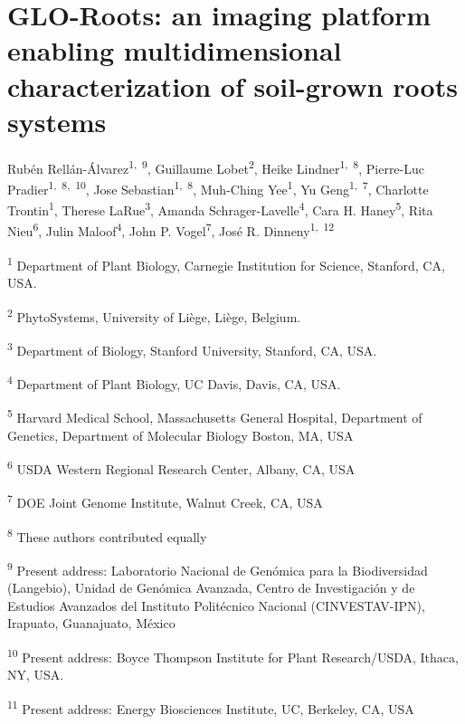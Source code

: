\documentclass[]{article}
\date{}
\begin{document}
\section{GLO-Roots: an imaging platform enabling multidimensional
characterization of soil-grown roots
systems}\label{glo-roots-an-imaging-platform-enabling-multidimensional-characterization-of-soil-grown-roots-systems}

Rubén Rellán-Álvarez\textsuperscript{1,~9}, Guillaume
Lobet\textsuperscript{2}, Heike Lindner\textsuperscript{1,~8},
Pierre-Luc Pradier\textsuperscript{1,~8,~10}, Jose
Sebastian\textsuperscript{1,~8}, Muh-Ching Yee\textsuperscript{1}, Yu
Geng\textsuperscript{1,~7}, Charlotte Trontin\textsuperscript{1},
Therese LaRue\textsuperscript{3}, Amanda
Schrager-Lavelle\textsuperscript{4}, Cara H. Haney\textsuperscript{5},
Rita Nieu\textsuperscript{6}, Julin Maloof\textsuperscript{4}, John P.
Vogel\textsuperscript{7}, José R. Dinneny\textsuperscript{1,~12}

\textsuperscript{1} Department of Plant Biology, Carnegie Institution
for Science, Stanford, CA, USA.

\textsuperscript{2} PhytoSystems, University of Liège, Liège, Belgium.

\textsuperscript{3} Department of Biology, Stanford University,
Stanford, CA, USA.

\textsuperscript{4} Department of Plant Biology, UC Davis, Davis, CA,
USA.

\textsuperscript{5} Harvard Medical School, Massachusetts General
Hospital, Department of Genetics, Department of Molecular Biology
Boston, MA, USA

\textsuperscript{6} USDA Western Regional Research Center, Albany, CA,
USA

\textsuperscript{7} DOE Joint Genome Institute, Walnut Creek, CA, USA

\textsuperscript{8} These authors contributed equally

\textsuperscript{9} Present address: Laboratorio Nacional de Genómica
para la Biodiversidad (Langebio), Unidad de Genómica Avanzada, Centro de
Investigación y de Estudios Avanzados del Instituto Politécnico Nacional
(CINVESTAV-IPN), Irapuato, Guanajuato, México

\textsuperscript{10} Present address: Boyce Thompson Institute for Plant
Research/USDA, Ithaca, NY, USA.

\textsuperscript{11} Present address: Energy Biosciences Institute, UC,
Berkeley, CA, USA
\end{document}
